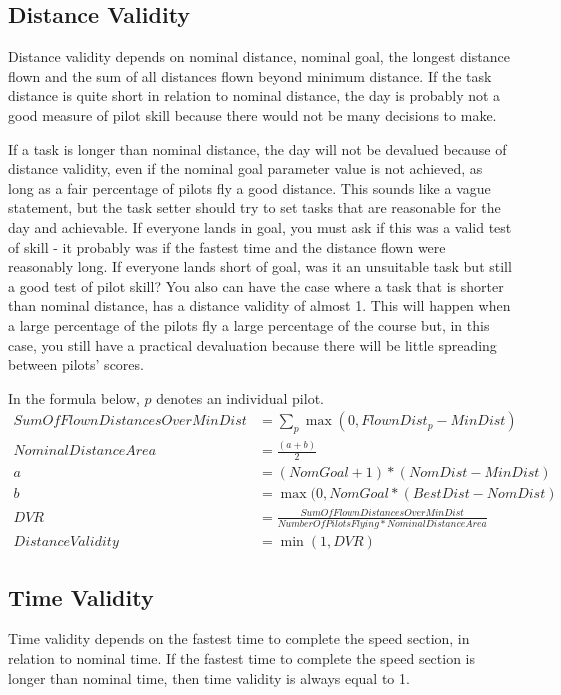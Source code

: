 \documentclass{article}
\begin{document}
\subsection{Distance Validity}
\label{sec:distance-validity}
Distance validity depends on nominal distance, nominal goal, the longest
distance flown and the sum of all distances flown beyond minimum distance. If
the task distance is quite short in relation to nominal distance, the day is
probably not a good measure of pilot skill because there would not be many
decisions to make.

If a task is longer than nominal distance, the day will not be devalued because
of distance validity, even if the nominal goal parameter value is not achieved,
as long as a fair percentage of pilots fly a good distance. This sounds like
a vague statement, but the task setter should try to set tasks that are
reasonable for the day and achievable. If everyone lands in goal, you must ask
if this was a valid test of skill - it probably was if the fastest time and the
distance flown were reasonably long. If everyone lands short of goal, was it an
unsuitable task but still a good test of pilot skill? You also can have the
case where a task that is shorter than nominal distance, has a distance
validity of almost 1. This will happen when a large percentage of the pilots
fly a large percentage of the course but, in this case, you still have
a practical devaluation because there will be little spreading between pilots’
scores.

In the formula below, \(p\) denotes an individual pilot.
\begin{align*}
    SumOfFlownDistancesOverMinDist &= \sum_p \max(0, FlownDist_p - MinDist) \\
    NominalDistanceArea &= \frac{(a + b)}{2} \\
    a &= (NomGoal + 1) * (NomDist - MinDist) \\
    b &= \max(0, NomGoal * (BestDist - NomDist) \\
    DVR &= \frac{SumOfFlownDistancesOverMinDist}{NumberOfPilotsFlying * NominalDistanceArea} \\
    DistanceValidity &= \min(1, DVR)
\end{align*}

\subsection{Time Validity}
Time validity depends on the fastest time to complete the speed section, in
relation to nominal time. If the fastest time to complete the speed section is
longer than nominal time, then time validity is always equal to 1.
\end{document}
